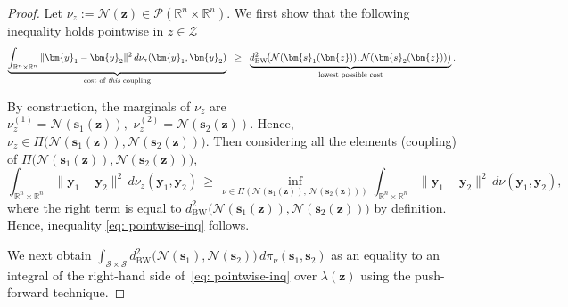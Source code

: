 \documentclass[opre,sglanonrev]{informs4}
\newcommand{\mZ}{\mathcal{Z}}
\newcommand{\mS}{\mathcal{S}}
\newcommand{\mN}{\mathcal{N}}
\newcommand{\mP}{\mathcal{P}}
\newcommand{\mbR}{\mathbb R}
\newcommand{\bs}{\bm{s}}
\newcommand{\by}{\bm{y}}
\newcommand{\bz}{\bm{z}}
\begin{document}
\begin{proof}
Let $\nu_z := \mN(\bz)\in\mP(\mbR^n\times\mbR^n)$. We first show that the following inequality holds pointwise in $z\in \mZ$
\vspace{-1.5em}
\begin{align}\label{eq: pointwise-inq}
      \underbrace{\int_{\mbR^n\times\mbR^n}
                 \|\by_1 - \by_2\|^2\,
                 d\nu_z(\by_1, \by_2)}
              _{\text{cost of \emph{this} coupling}}
  \;\;\ge\;\;
  \underbrace{d^2_{\mathrm{BW}}\!\bigl(\mN(\bs_1(\bz)),\mN(\bs_2(\bz))\bigr)}
              _{\text{lowest possible cost}}.
\end{align}

By construction, the marginals of $\nu_z$ are $\nu^{(1)}_z=\mN(\bs_1(\bz)),\,\, \nu^{(2)}_z=\mN(\bs_2(\bz))$. Hence, $\nu_z\in\Pi\bigl(\mN(\bs_1(\bz)),\mN(\bs_2(\bz))\bigr)$. Then considering all the elements (coupling) of $\Pi\bigl(\mN(\bs_1(\bz)),\mN(\bs_2(\bz))\bigr)$,
\[
\int_{\mbR^n\times\mbR^n}
                 \|\by_1-\by_2\|^2\,
                 d\nu_z(\by_1, \by_2) 
\, \geq\,
\inf_{\nu\in\Pi(\mN(\bs_1(\bz)),\,\mN(\bs_2(\bz)))}
\int_{\mbR^n\times\mbR^n}\|\by_1-\by_2\|^{2}\,d\nu(\by_1,\by_2),
\]
where the right term is equal to $d^2_{\mathrm{BW}}\!\bigl(\mN(\bs_1(\bz)),\mN(\bs_2(\bz))\bigr)$ by definition. Hence, inequality \eqref{eq: pointwise-inq} follows. 

We next obtain
\(
  \displaystyle
  \int_{\mS\times \mS} d^2_{\mathrm{BW}}\bigl(\mN(\bs_1),\mN(\bs_2)\bigr)\,d\pi_\nu(\bs_1,\bs_2)
\)
as an equality to an integral of the right-hand side of~\eqref{eq: pointwise-inq} over $\lambda(\bz)$ using the push-forward technique.


\end{proof}
\end{document}
